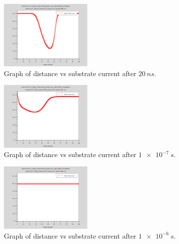 \documentclass[12pt]{article}
\begin{document}
\begin{figure}[H]
  \centering
  \includegraphics[width=0.4\textwidth]{PC_100um_Nsub1e+015_density1.0e-2_after2e-008s}
  \caption{Graph of distance vs substrate current after $\SI{20}{ns}$.}
  \label{fig:density1.0e-2_after2e-008s}
\end{figure}
\begin{figure}[H]
  \centering
  \includegraphics[width=0.4\textwidth]{PC_100um_Nsub1e+015_density1.0e-2_after1e-007s}
  \caption{Graph of distance vs substrate current after $\SI{1e-7}{s}$.}
  \label{fig:density1.0e-2_after1.0e-1-007s}
\end{figure}
\begin{figure}[H]
  \centering
  \includegraphics[width=0.4\textwidth]{PC_100um_Nsub1e+015_density1.0e-2_after1e-006s}
  \caption{Graph of distance vs substrate current after $\SI{1e-6}{s}$.}
  \label{fig:density1.0e-2_after1e-006s}
\end{figure}



\end{document}
